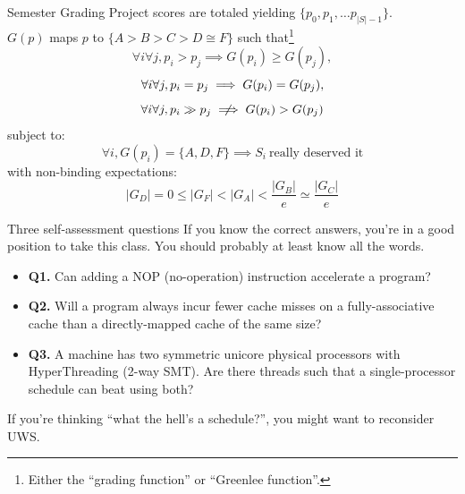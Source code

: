\documentclass{beamer}
\begin{document}
\begin{frame}{Semester Grading}
Project scores are totaled yielding $\{p_0, p_1, \dotsc p_{|S| - 1}\}$.\linebreak \\
$G(p)$ maps $p$ to $\{A > B > C > D \cong F\}$ such that\footnote{Either the ``grading function'' or ``Greenlee function''.}
\begin{equation}
\forall i \forall j, p_i > p_j \implies G(p_i) \ge G(p_j), \nonumber
\end{equation}
\begin{equation}
\forall i \forall j, p_i = p_j \implies G(p_i) = G(p_j), \nonumber \linebreak
\end{equation}
\begin{equation}
\forall i \forall j, p_i\gg p_j \centernot\implies G(p_i) > G(p_j) \nonumber
\end{equation}
subject to:
\begin{equation}
\forall i, G(p_i) = \{A, D, F\} \implies S_i\ \text{really deserved it}\nonumber
\end{equation}
with non-binding expectations:
\begin{equation}
|G_D| = 0 \le |G_F| < |G_A| < \frac{|G_B|}{e} \simeq \frac{|G_C|}{e} \nonumber
\end{equation}
\end{frame}

\begin{frame}{Three self-assessment questions}
If you know the correct answers, you're in a good position to take this
class. You should probably at least know all the words.
\vspace{.1in}
\begin{itemize}
\item \textbf{Q1.} Can adding a NOP (no-operation) instruction accelerate a program?
\item \textbf{Q2.} Will a program always incur fewer cache misses on a fully-associative
	cache than a directly-mapped cache of the same size?
\item \textbf{Q3.} A machine has two symmetric unicore physical processors with HyperThreading
	(2-way SMT). Are there threads such that a single-processor
	schedule can beat using both?
\end{itemize}
\vspace{.1in}
If you're thinking ``what the hell's a schedule?'', you might want to reconsider UWS.
\end{frame}
\end{document}
